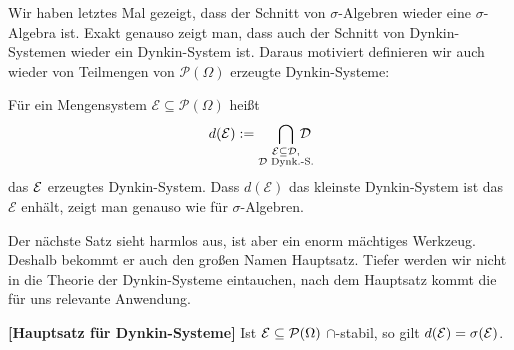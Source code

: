 Wir haben letztes Mal gezeigt, dass der Schnitt von $\sigma$-Algebren wieder eine $\sigma$-Algebra ist. Exakt genauso zeigt man, dass auch der Schnitt von Dynkin-Systemen wieder ein Dynkin-System ist. Daraus motiviert definieren wir auch wieder von Teilmengen von $\mathcal P(\Omega)$ erzeugte Dynkin-Systeme:
\begin{deff} 
F\"ur ein Mengensystem $\mathcal E\subseteq \mathcal P(\Omega)$ hei\ss t
	\[ d(\mathcal{E}) := \bigcap\limits_{\substack{\mathcal{E} \subseteq \mathcal{D},\\ \mathcal{D} \text{ Dynk.-S.}}} \! \! \! \! \! \! \! \mathcal{D} \] das $\mathcal{E}$ erzeugtes Dynkin-System. Dass $d(\mathcal E)$ das kleinste Dynkin-System ist das $\mathcal E$ enh\"alt, zeigt man genauso wie f\"ur $\sigma$-Algebren.
\end{deff}
Der n\"achste Satz sieht harmlos aus, ist aber ein enorm m\"achtiges Werkzeug. Deshalb bekommt er auch den gro\ss en Namen \glqq Hauptsatz\grqq. Tiefer werden wir nicht in die Theorie der Dynkin-Systeme eintauchen, nach dem Hauptsatz kommt die f\"ur uns relevante Anwendung.
\begin{satz} \label{Hauptsatz}  \textbf{[Hauptsatz für Dynkin-Systeme]}
	Ist $\mathcal{E} \subseteq \mathcal{P} (\Omega)$ $\cap$-stabil, so gilt $d(\mathcal{E}) = \sigma(\mathcal{E})$.
\end{satz}

